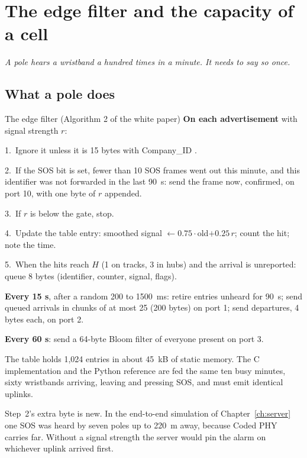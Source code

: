 \documentclass[11pt,a4paper,twoside,openany]{book}
\newcommand{\hook}[1]{{\noindent\fontsize{13}{19}\selectfont\itshape\color{rsmuted}#1\par}\vspace{12pt}}
\begin{document}
\chapter{The edge filter and the capacity of a cell}\label{ch:edge}
\hook{A pole hears a wristband a hundred times in a minute. It needs to say so once.}
\section{What a pole does}
\begin{algo}{The edge filter (Algorithm 2 of the white paper)}
\textbf{On each advertisement} with signal strength $r$:\par
1.\ Ignore it unless it is 15 bytes with Company\_ID .\par
2.\ If the SOS bit is set, fewer than 10 SOS frames went out this minute, and this identifier was not forwarded in the
last 90~s: send the frame now, confirmed, on port 10, with one byte of $r$ appended.\par
3.\ If $r$ is below the gate, stop.\par
4.\ Update the table entry: smoothed signal $\leftarrow0.75\cdot$old$+0.25\,r$; count the hit; note the time.\par
5.\ When the hits reach $H$ (1 on tracks, 3 in hubs) and the arrival is unreported: queue 8 bytes (identifier,
counter, signal, flags).\par
\textbf{Every 15 s}, after a random 200 to 1500~ms: retire entries unheard for 90~s; send queued arrivals in chunks of
at most 25 (200 bytes) on port 1; send departures, 4 bytes each, on port 2.\par
\textbf{Every 60 s}: send a 64-byte Bloom filter of everyone present on port 3.
\end{algo}
The table holds 1,024 entries in about 45~kB of static memory. The C implementation and the Python reference are fed
the same ten busy minutes, sixty wristbands arriving, leaving and pressing SOS, and must emit identical uplinks.

Step~2's extra byte is new. In the end-to-end simulation of Chapter~\ref{ch:server} one SOS was heard by seven poles
up to 220~m away, because Coded PHY carries far. Without a signal strength the server would pin the alarm on whichever
uplink arrived first.
\end{document}
